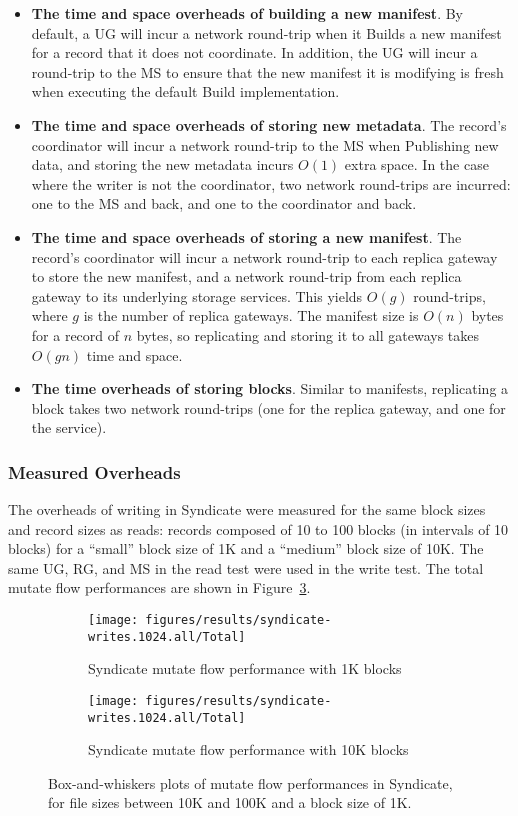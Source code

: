 \begin{itemize}
\item \textbf{The time and space overheads of building a new manifest}.  By
default, a UG will incur a network round-trip when it Builds a new manifest for a record that
it does not coordinate.  In addition, the UG will incur a round-trip to
the MS to ensure that the new manifest it is modifying is fresh when executing
the default Build implementation.
\item \textbf{The time and space overheads of storing new metadata}.  The
record's coordinator will incur a network round-trip to the MS when Publishing
new data, and storing the new metadata incurs $O(1)$ extra space.  In the case
where the writer is not the coordinator, two network round-trips are incurred:
one to the MS and back, and one to the coordinator and back.
\item \textbf{The time and space overheads of storing a new manifest}.  The
record's coordinator will incur a network round-trip to each replica gateway to
store the new manifest, and a network round-trip from each replica gateway to
its underlying storage services.  This yields $O(g)$ round-trips, where $g$ is the number of
replica gateways.  The manifest size is $O(n)$ bytes for a record of $n$ bytes,
so replicating and storing it to all gateways takes $O(gn)$ time and space.
\item \textbf{The time overheads of storing blocks}.  Similar to manifests,
replicating a block takes two network round-trips (one for the replica gateway,
and one for the service).
\end{itemize}

\subsubsection{Measured Overheads}

The overheads of writing in Syndicate were measured for the same block sizes and
record sizes as reads:  records composed of 10 to 100 blocks (in intervals of 10
blocks) for a ``small'' block size of 1K and a ``medium'' block size of 10K.
The same UG, RG, and MS in the read test were used in the write test.
The total mutate flow performances are shown in
Figure~\ref{fig:syndicate-writes-total}.

\begin{figure}[htp!]
   \centering
   \begin{subfigure}[b]{.8\textwidth}
      \texttt{[image: figures/results/syndicate-writes.1024.all/Total]}
      \label{fig:syndicate-read-discover-1k}
      \caption{Syndicate mutate flow performance with 1K blocks}
   \end{subfigure}
   \begin{subfigure}[b]{.8\textwidth}
      \texttt{[image: figures/results/syndicate-writes.1024.all/Total]}
      \label{fig:syndicate-read-acquire-1k}
      \caption{Syndicate mutate flow performance with 10K blocks}
   \end{subfigure}
   \caption{Box-and-whiskers plots of mutate flow performances in
   Syndicate, for file sizes between 10K and 100K and a block size of 1K.}
   \label{fig:syndicate-writes-total}
\end{figure}

